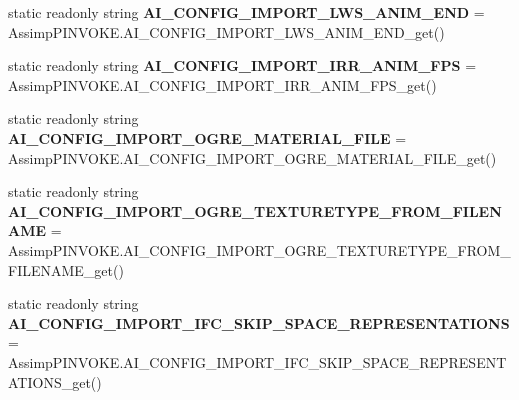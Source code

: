 \begin{DoxyCompactItemize}
\item 
\hypertarget{class_assimp_ad7211b61adbfa2f36bdd7f1705d54f5c}{static readonly string {\bfseries A\+I\+\_\+\+C\+O\+N\+F\+I\+G\+\_\+\+I\+M\+P\+O\+R\+T\+\_\+\+L\+W\+S\+\_\+\+A\+N\+I\+M\+\_\+\+E\+N\+D} = Assimp\+P\+I\+N\+V\+O\+K\+E.\+A\+I\+\_\+\+C\+O\+N\+F\+I\+G\+\_\+\+I\+M\+P\+O\+R\+T\+\_\+\+L\+W\+S\+\_\+\+A\+N\+I\+M\+\_\+\+E\+N\+D\+\_\+get()}\label{class_assimp_ad7211b61adbfa2f36bdd7f1705d54f5c}

\item 
\hypertarget{class_assimp_a438a5373b2c7d1927014692c073f3707}{static readonly string {\bfseries A\+I\+\_\+\+C\+O\+N\+F\+I\+G\+\_\+\+I\+M\+P\+O\+R\+T\+\_\+\+I\+R\+R\+\_\+\+A\+N\+I\+M\+\_\+\+F\+P\+S} = Assimp\+P\+I\+N\+V\+O\+K\+E.\+A\+I\+\_\+\+C\+O\+N\+F\+I\+G\+\_\+\+I\+M\+P\+O\+R\+T\+\_\+\+I\+R\+R\+\_\+\+A\+N\+I\+M\+\_\+\+F\+P\+S\+\_\+get()}\label{class_assimp_a438a5373b2c7d1927014692c073f3707}

\item 
\hypertarget{class_assimp_a892deaa2451080f7d40452a758f4a2ba}{static readonly string {\bfseries A\+I\+\_\+\+C\+O\+N\+F\+I\+G\+\_\+\+I\+M\+P\+O\+R\+T\+\_\+\+O\+G\+R\+E\+\_\+\+M\+A\+T\+E\+R\+I\+A\+L\+\_\+\+F\+I\+L\+E} = Assimp\+P\+I\+N\+V\+O\+K\+E.\+A\+I\+\_\+\+C\+O\+N\+F\+I\+G\+\_\+\+I\+M\+P\+O\+R\+T\+\_\+\+O\+G\+R\+E\+\_\+\+M\+A\+T\+E\+R\+I\+A\+L\+\_\+\+F\+I\+L\+E\+\_\+get()}\label{class_assimp_a892deaa2451080f7d40452a758f4a2ba}

\item 
\hypertarget{class_assimp_af023328568cbdf32f2f5fbf1ba973af8}{static readonly string {\bfseries A\+I\+\_\+\+C\+O\+N\+F\+I\+G\+\_\+\+I\+M\+P\+O\+R\+T\+\_\+\+O\+G\+R\+E\+\_\+\+T\+E\+X\+T\+U\+R\+E\+T\+Y\+P\+E\+\_\+\+F\+R\+O\+M\+\_\+\+F\+I\+L\+E\+N\+A\+M\+E} = Assimp\+P\+I\+N\+V\+O\+K\+E.\+A\+I\+\_\+\+C\+O\+N\+F\+I\+G\+\_\+\+I\+M\+P\+O\+R\+T\+\_\+\+O\+G\+R\+E\+\_\+\+T\+E\+X\+T\+U\+R\+E\+T\+Y\+P\+E\+\_\+\+F\+R\+O\+M\+\_\+\+F\+I\+L\+E\+N\+A\+M\+E\+\_\+get()}\label{class_assimp_af023328568cbdf32f2f5fbf1ba973af8}

\item 
\hypertarget{class_assimp_af6fdb5aeffe11a806a59a7bae41931d9}{static readonly string {\bfseries A\+I\+\_\+\+C\+O\+N\+F\+I\+G\+\_\+\+I\+M\+P\+O\+R\+T\+\_\+\+I\+F\+C\+\_\+\+S\+K\+I\+P\+\_\+\+S\+P\+A\+C\+E\+\_\+\+R\+E\+P\+R\+E\+S\+E\+N\+T\+A\+T\+I\+O\+N\+S} = Assimp\+P\+I\+N\+V\+O\+K\+E.\+A\+I\+\_\+\+C\+O\+N\+F\+I\+G\+\_\+\+I\+M\+P\+O\+R\+T\+\_\+\+I\+F\+C\+\_\+\+S\+K\+I\+P\+\_\+\+S\+P\+A\+C\+E\+\_\+\+R\+E\+P\+R\+E\+S\+E\+N\+T\+A\+T\+I\+O\+N\+S\+\_\+get()}\label{class_assimp_af6fdb5aeffe11a806a59a7bae41931d9}


\end{DoxyCompactItemize}

